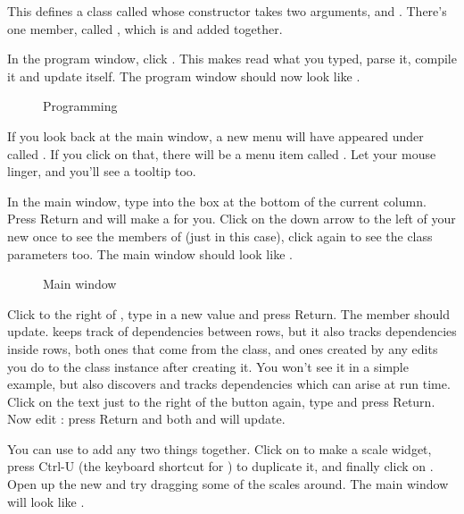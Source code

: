 This defines a class called  whose constructor takes two arguments,
 and . There's one member, called , which is 
and  added together.

In the program window, click . This makes \nip{}
read what you typed, parse it, compile it and update itself. The program
window should now look like .

\begin{figure}
\caption{Programming }
\end{figure}

If you look back at the main \nip{} window, a new menu will have appeared
under  called . If you click on that, there will
be a menu item called . Let your mouse linger, and you'll see a
tooltip too.

In the main window, type  into the box at the bottom of the
current column. Press Return and \nip{} will make a  for you. Click
on the down arrow to the left of your new  once to see the members
of  (just  in this case), click again to see the class
parameters too. The main window should look like .

\begin{figure}
\caption{Main window }
\end{figure}

Click to the right of , type in a new value and press Return. The
 member should update. \nip{} keeps track of dependencies between
rows, but it also tracks dependencies inside rows, both ones that come
from the class, and ones created by any edits you do to the class instance
after creating it. You won't see it in a simple example, but \nip{} also
discovers and tracks dependencies which can arise at run time.  Click on
the text just to the right of the  button again, type  and
press Return. Now edit : press Return and both  and 
will update.

You can use  to add any two things together. Click on
 to make a scale widget, press Ctrl-U
(the keyboard shortcut for ) to duplicate it, and
finally click on . Open up the new
 and try dragging some of the scales around. The main window will
look like .

